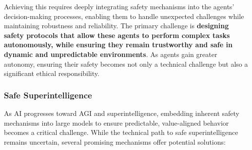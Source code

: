 Achieving this requires deeply integrating safety mechanisms into the agents' decision-making processes, enabling them to handle unexpected challenges while maintaining robustness and reliability. The primary challenge is \textbf{designing safety protocols that allow these agents to perform complex tasks autonomously, while ensuring they remain trustworthy and safe in dynamic and unpredictable environments}. As agents gain greater autonomy, ensuring their safety becomes not only a technical challenge but also a significant ethical responsibility.

\subsubsection{Safe Superintelligence}
As AI progresses toward AGI and superintelligence, embedding inherent safety mechanisms into large models to ensure predictable, value-aligned behavior becomes a critical challenge. While the technical path to safe superintelligence remains uncertain, several promising mechanisms offer potential solutions:

